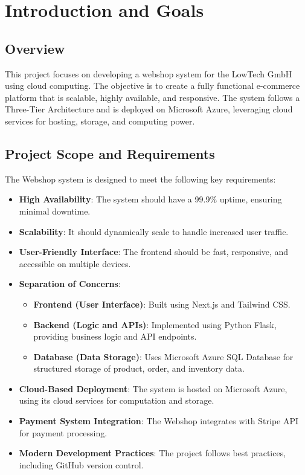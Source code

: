 \hypertarget{introduction-and-goals}{%
\section{Introduction and Goals}\label{section-introduction-and-goals}}

\subsection{Overview}
This project focuses on developing a webshop system for the LowTech GmbH using cloud computing. The objective is to create a fully functional e-commerce platform that is scalable, highly available, and responsive. The system follows a Three-Tier Architecture and is deployed on Microsoft Azure, leveraging cloud services for hosting, storage, and computing power.

\subsection{Project Scope and Requirements}
The Webshop system is designed to meet the following key requirements:

\begin{itemize}
    \item \textbf{High Availability}: The system should have a 99.9\% uptime, ensuring minimal downtime.
    \item \textbf{Scalability}: It should dynamically scale to handle increased user traffic.
    \item \textbf{User-Friendly Interface}: The frontend should be fast, responsive, and accessible on multiple devices.
    \item \textbf{Separation of Concerns}:
    \begin{itemize}
        \item \textbf{Frontend (User Interface)}: Built using Next.js and Tailwind CSS.
        \item \textbf{Backend (Logic and APIs)}: Implemented using Python Flask, providing business logic and API endpoints.
        \item \textbf{Database (Data Storage)}: Uses Microsoft Azure SQL Database for structured storage of product, order, and inventory data.
    \end{itemize}
    \item \textbf{Cloud-Based Deployment}: The system is hosted on Microsoft Azure, using its cloud services for computation and storage.
    \item \textbf{Payment System Integration}: The Webshop integrates with Stripe API for payment processing.
    \item \textbf{Modern Development Practices}: The project follows best practices, including GitHub version control.
\end{itemize}

